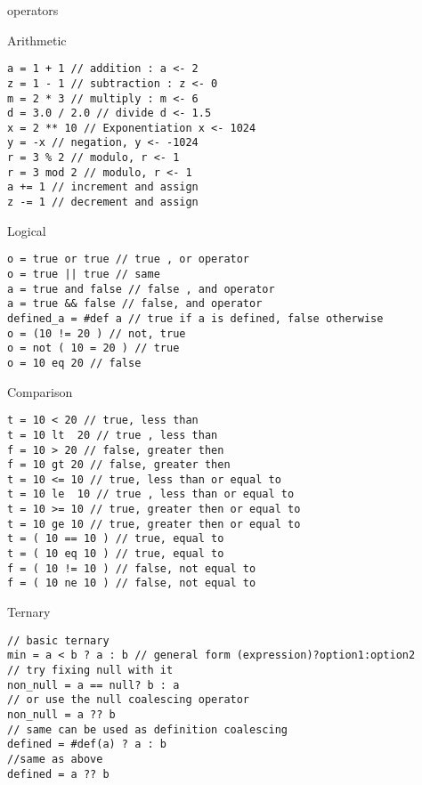 \begin{section}{operators}


\begin{subsection}{Arithmetic}
\begin{lstlisting}[style=JexlStyle]
a = 1 + 1 // addition : a <- 2
z = 1 - 1 // subtraction : z <- 0
m = 2 * 3 // multiply : m <- 6
d = 3.0 / 2.0 // divide d <- 1.5   
x = 2 ** 10 // Exponentiation x <- 1024
y = -x // negation, y <- -1024 
r = 3 % 2 // modulo, r <- 1 
r = 3 mod 2 // modulo, r <- 1    
a += 1 // increment and assign 
z -= 1 // decrement and assign 
\end{lstlisting}

\end{subsection}

\begin{subsection}{Logical}
\begin{lstlisting}[style=JexlStyle]
o = true or true // true , or operator 
o = true || true // same 
a = true and false // false , and operator 
a = true && false // false, and operator  
defined_a = #def a // true if a is defined, false otherwise
o = (10 != 20 ) // not, true 
o = not ( 10 = 20 ) // true 
o = 10 eq 20 // false
\end{lstlisting}

\end{subsection}


\begin{subsection}{Comparison}
\begin{lstlisting}[style=JexlStyle]
t = 10 < 20 // true, less than
t = 10 lt  20 // true , less than 
f = 10 > 20 // false, greater then 
f = 10 gt 20 // false, greater then 
t = 10 <= 10 // true, less than or equal to 
t = 10 le  10 // true , less than or equal to 
t = 10 >= 10 // true, greater then or equal to 
t = 10 ge 10 // true, greater then or equal to 
t = ( 10 == 10 ) // true, equal to 
t = ( 10 eq 10 ) // true, equal to 
f = ( 10 != 10 ) // false, not equal to 
f = ( 10 ne 10 ) // false, not equal to 
\end{lstlisting}
\end{subsection}

\begin{subsection}{Ternary}
\begin{center}\begin{minipage}{\linewidth}
\begin{lstlisting}[style=JexlStyle]
// basic ternary 
min = a < b ? a : b // general form (expression)?option1:option2 
// try fixing null with it
non_null = a == null? b : a
// or use the null coalescing operator   
non_null = a ?? b 
// same can be used as definition coalescing
defined = #def(a) ? a : b
//same as above 
defined = a ?? b
\end{lstlisting}
\end{minipage}
\end{center}
\end{subsection}


\end{section}


